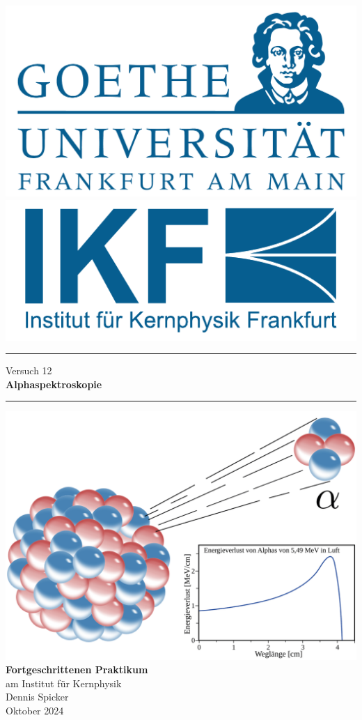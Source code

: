 \documentclass{scrartcl}
\begin{document}
\begin{titlepage}
	\newcommand{\HRule}{\rule{\textwidth}{0.5mm}}
	\begin{center}
	{\includegraphics[width=0.3\linewidth]{img/GU-Logo-blau-CMYK} \hfill
	\includegraphics[width=0.3\linewidth]{img/IKF_Logo} \\ }
	\vspace{1cm}
	\HRule
	\vspace{0.4cm}
	{\huge Versuch 12} \\
	\vspace{0.5cm}
	{\huge {\bfseries Alphaspektroskopie}} \\
	\vspace{0.2cm}
	\HRule
	\vfill
	\includegraphics[width=14cm]{img/front_cover.png}
	\vfill
	{\Large\bfseries Fortgeschrittenen Praktikum} \\
	\vspace{0.3cm}
	{\Large am Institut für Kernphysik} \\
	\vspace{1.5cm}
	{\small 
		Dennis Spicker \\
		Oktober 2024
	}
	\end{center} 
	\thispagestyle{empty}
	\clearpage
\end{titlepage}
\setcounter{tocdepth}{2}
\tableofcontents
\clearpage
\end{document}
